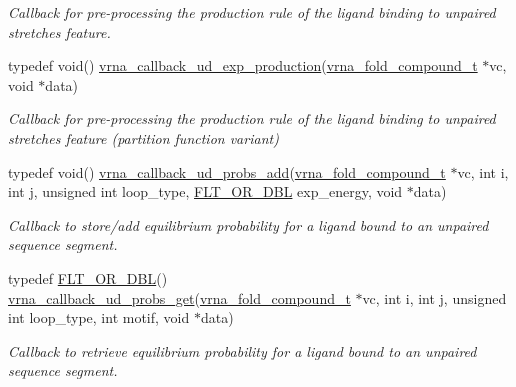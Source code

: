 \begin{DoxyCompactItemize}
\begin{DoxyCompactList}\small\item\em Callback for pre-\/processing the production rule of the ligand binding to unpaired stretches feature. \end{DoxyCompactList}\item 
typedef void() \hyperlink{group__domains__up_ga33d78327dcd04c1ca5ab2887edc18c7b}{vrna\+\_\+callback\+\_\+ud\+\_\+exp\+\_\+production}(\hyperlink{group__fold__compound_ga1b0cef17fd40466cef5968eaeeff6166}{vrna\+\_\+fold\+\_\+compound\+\_\+t} $\ast$vc, void $\ast$data)
\begin{DoxyCompactList}\small\item\em Callback for pre-\/processing the production rule of the ligand binding to unpaired stretches feature (partition function variant) \end{DoxyCompactList}\item 
typedef void() \hyperlink{group__domains__up_gab10498abc84fcaf336aca8f8d7d42eb2}{vrna\+\_\+callback\+\_\+ud\+\_\+probs\+\_\+add}(\hyperlink{group__fold__compound_ga1b0cef17fd40466cef5968eaeeff6166}{vrna\+\_\+fold\+\_\+compound\+\_\+t} $\ast$vc, int i, int j, unsigned int loop\+\_\+type, \hyperlink{group__data__structures_ga31125aeace516926bf7f251f759b6126}{F\+L\+T\+\_\+\+O\+R\+\_\+\+D\+BL} exp\+\_\+energy, void $\ast$data)
\begin{DoxyCompactList}\small\item\em Callback to store/add equilibrium probability for a ligand bound to an unpaired sequence segment. \end{DoxyCompactList}\item 
typedef \hyperlink{group__data__structures_ga31125aeace516926bf7f251f759b6126}{F\+L\+T\+\_\+\+O\+R\+\_\+\+D\+BL}() \hyperlink{group__domains__up_gaa10ba1b6f1e179ea84c5caca9cdaae67}{vrna\+\_\+callback\+\_\+ud\+\_\+probs\+\_\+get}(\hyperlink{group__fold__compound_ga1b0cef17fd40466cef5968eaeeff6166}{vrna\+\_\+fold\+\_\+compound\+\_\+t} $\ast$vc, int i, int j, unsigned int loop\+\_\+type, int motif, void $\ast$data)
\begin{DoxyCompactList}\small\item\em Callback to retrieve equilibrium probability for a ligand bound to an unpaired sequence segment. \end{DoxyCompactList}\end{DoxyCompactItemize}
